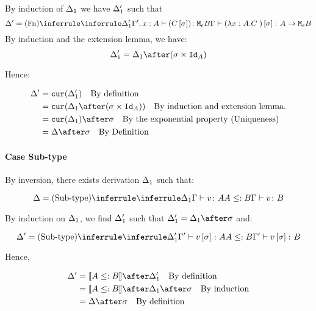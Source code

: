 {    By induction of $\Delta_1$ we have $\Delta_1'$ such that
    \begin{equation}
        \D' = \ntreeruleI{Fn}{
            \treeruleI{\D_1'}{\typerelation{\G', x:A}{(C\ssi)}{\meb}}
        }{\typerelation{\G}{(\lam{x}{A}{C})\ssi}{\aeb}}
    \end{equation}
    By induction and the extension lemma, we have:
    \begin{equation}
        \D_1' = \D_1\after(\si\times\Id{A})
    \end{equation}

    Hence:

    \begin{align}
        \D' &= \cur{\D_1'}\qt{By definition}\\
            &= \cur{\D_1\after(\si\times\Id{A})}\qt{By induction and extension lemma.}\\
            & = \cur{\D_1}\after\si\qt{By the exponential property (Uniqueness)}\\
            &= \D\after\si\qt{By Definition}\\
    \end{align}
    \paragraph{Case Sub-type}
    By inversion, there exists derivation $\Delta_1$ such that:

    \begin{equation}
        \D = \ntreeruleII{Sub-type}{\treeruleI{\D_1}{\typerelation{\G}{v}{A}}}{ A\subtype B}{\typerelation{\G}{v}{B}}
    \end{equation}

    By induction on $\Delta_1$, we find $\Delta_1'$ such that $\D_1' = \D_1\after\si$ and:

    \begin{equation}
        \D' = \ntreeruleII{Sub-type}{\treeruleI{\D_1'}{\typerelation{\G'}{v\ssi}{A}}}{ A\subtype B}{\typerelation{\G'}{v\ssi}{B}}
    \end{equation}

    Hence,

    \begin{align}
        \D' &= \deno{A\subtype B}\after\D_1'\qt{By definition}\\
            &= \deno{A\subtype B}\after\D_1\after\si\qt{By induction}\\
            &= \D\after\si\qt{By definition}\\
    \end{align}
}
